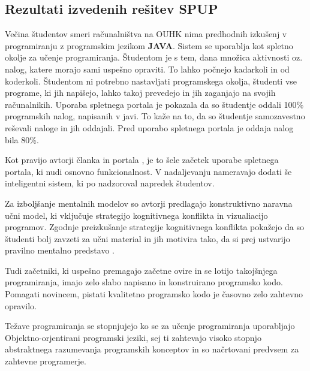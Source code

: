 \subsection{Rezultati izvedenih rešitev SPUP}
\label{sec:rezultati_izvedenih_rešitev}

Večina študentov smeri računalništva na OUHK nima predhodnih izkušenj
v programiranju z programskim jezikom \textbf{JAVA}. Sistem se
uporablja kot spletno okolje za učenje programiranja. Študentom je s
tem, dana množica aktivnosti oz. nalog, katere morajo sami uspešno
opraviti. To lahko počnejo kadarkoli in od koderkoli. Študentom ni
potrebno nastavljati programskega okolja, študenti vse programe, ki
jih napišejo, lahko takoj prevedejo in jih zaganjajo na svojih
računalnikih. Uporaba spletnega portala je pokazala da so študentje
oddali 100\% programskih nalog, napisanih v javi. To kaže na to, da so
študentje samozavestno reševali naloge in jih oddajali. Pred uporabo
spletnega portala je oddaja nalog bila 80\%.

Kot pravijo avtorji članka in portala \cite{ITaLCP_DistanceEdu}, je to
šele začetek uporabe spletnega portala, ki nudi osnovno
funkcionalnost. V nadaljevanju nameravajo dodati še inteligentni
sistem, ki po nadzoroval napredek študentov.

Za izboljšanje mentalnih modelov so avtorji predlagajo konstruktivno
naravna učni model, ki vključuje strategijo kognitivnega konflikta in
vizualiacijo programov. Zgodnje preizkušanje strategije kognitivnega
konflikta pokažejo da so študenti bolj zavzeti za učni material in jih
motivira tako, da si prej ustvarijo pravilno mentalno predstavo
\cite{mentalModels}.

Tudi začetniki, ki uspešno premagajo začetne ovire in se lotijo
takojšnjega programiranja, imajo zelo slabo napisano in konstruirano
programsko kodo. Pomagati novincem, pistati kvalitetno programsko kodo
je časovno zelo zahtevno opravilo.

Težave programiranja se stopnjujejo ko se za učenje programiranja
uporabljajo Objektno-orjentirani programski jeziki, sej ti zahtevajo
visoko stopnjo abstraktnega razumevanja programskih konceptov in so
načrtovani predvsem za zahtevne programerje.


